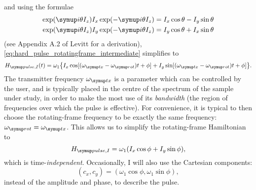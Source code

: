 and using the formulae
\begin{align}
    \exp(\mi\theta I_z)I_x\exp(-\mi\theta I_z) = I_x\cos\theta - I_y\sin\theta \label{eq:sandwich_formula_1} \\
    \exp(\mi\theta I_z)I_y\exp(-\mi\theta I_z) = I_y\cos\theta + I_x\sin\theta \label{eq:sandwich_formula_2}
\end{align}
(see Appendix A.2 of Levitt\autocite{Levitt2008} for a derivation), \cref{eq:hard_pulse_rotatingframe_intermediate} simplifies to
\begin{equation}
    \label{eq:hard_pulse_rotatingframe}
    \HpulseI(t) = \omega_1 \big\{I_x \cos[(\omegatx - \omegarot)t + \phi] + I_y \sin[(\omegatx - \omegarot)t + \phi] \big\}.
\end{equation}
The transmitter frequency $\omegatx$ is a parameter which can be controlled by the user, and is typically placed in the centre of the spectrum of the sample under study, in order to make the most use of its \textit{bandwidth} (the region of frequencies over which the pulse is effective).
For convenience, it is typical to then choose the rotating-frame frequency to be exactly the same frequency: $\omegarot = \omegatx$.
This allows us to simplify the rotating-frame Hamiltonian to
\begin{equation}
    \label{eq:hard_pulse_onresonance}
    \HpulseI = \omega_1 (I_x\cos\phi + I_y\sin\phi),
\end{equation}
which is time-\textit{independent}.
Occasionally, I will also use the Cartesian components:
\begin{equation}
    \label{eq:pulse_cartesian}
    (c_x, c_y) = (\omega_1 \cos\phi, \omega_1 \sin\phi),
\end{equation}
instead of the amplitude and phase, to describe the pulse.

